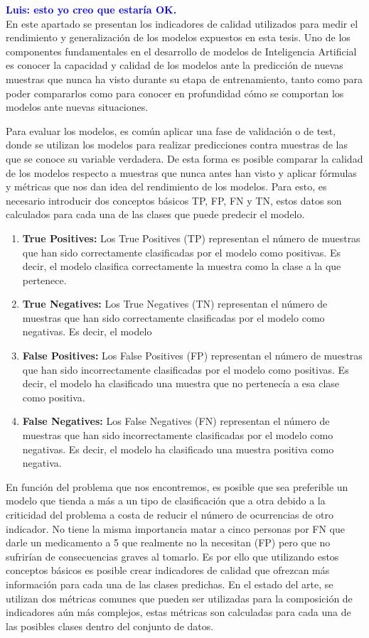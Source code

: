 \documentclass{uathesis-es}
\begin{document}
\textcolor{blue}{\textbf{Luis: esto yo creo que estaría OK.}}\\

En este apartado se presentan los indicadores de calidad utilizados para medir el rendimiento y generalización de los modelos expuestos en esta tesis. Uno de los componentes fundamentales en el desarrollo de modelos de Inteligencia Artificial es conocer la capacidad y calidad de los modelos ante la predicción de nuevas muestras que nunca ha visto durante su etapa de entrenamiento, tanto como para poder compararlos como para conocer en profundidad cómo se comportan los modelos ante nuevas situaciones.

Para evaluar los modelos, es común aplicar una fase de validación o de test, donde se utilizan los modelos para realizar predicciones contra muestras de las que se conoce su variable verdadera. De esta forma es posible comparar la calidad de los modelos respecto a muestras que nunca antes han visto y aplicar fórmulas y métricas que nos dan idea del rendimiento de los modelos. Para esto, es necesario introducir dos conceptos básicos TP, FP, FN y TN, estos datos son calculados para cada una de las clases que puede predecir el modelo.

\begin{enumerate}
    \item \textbf{True Positives:} Los True Positives (TP) representan el número de muestras que han sido correctamente clasificadas por el modelo como positivas. Es decir, el modelo clasifica correctamente la muestra como la clase a la que pertenece.
    \item \textbf{True Negatives:} Los True Negatives (TN) representan el número de muestras que han sido correctamente clasificadas por el modelo como negativas. Es decir, el modelo
    \item \textbf{False Positives:} Los False Positives (FP) representan el número de muestras que han sido incorrectamente clasificadas por el modelo como positivas. Es decir, el modelo ha clasificado una muestra que no pertenecía a esa clase como positiva.
    \item \textbf{False Negatives:} Los False Negatives (FN) representan el número de muestras que han sido incorrectamente clasificadas por el modelo como negativas. Es decir, el modelo ha clasificado una muestra positiva como negativa.
\end{enumerate}

En función del problema que nos encontremos, es posible que sea preferible un modelo que tienda a más a un tipo de clasificación que a otra debido a la criticidad del problema a costa de reducir el número de ocurrencias de otro indicador. No tiene la misma importancia matar a cinco personas por FN que darle un medicamento a 5 que realmente no la necesitan (FP) pero que no sufrirían de consecuencias graves al tomarlo. Es por ello que utilizando estos conceptos básicos es posible crear indicadores de calidad que ofrezcan más información para cada una de las clases predichas. En el estado del arte, se utilizan dos métricas comunes que pueden ser utilizadas para la composición de indicadores aún más complejos, estas métricas son calculadas para cada una de las posibles clases dentro del conjunto de datos.
\end{document}
